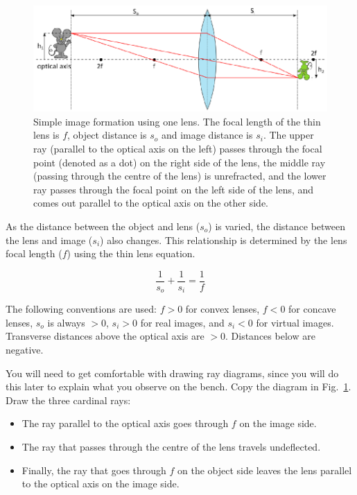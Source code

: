 \documentclass[a4paper]{report}
\begin{document}
\begin{figure}[h]
\center
\includegraphics{image_forming_basics.eps}
\caption{Simple image formation using one lens. 
The focal length of the thin lens is $f$, object distance is $s_o$ and image distance is $s_i$. 
The upper ray (parallel to the optical axis on the left) passes through the focal point (denoted as a dot) on the right side of the lens, the middle ray (passing through the centre of the lens) is unrefracted, and the lower ray passes through the focal point on the left side of the lens, and comes out parallel to the optical axis on the other side. 
}
\label{fig:imageforming}
\end{figure}

As the distance between the object and lens ($s_o$) is varied, the distance between the lens and image ($s_i$) also changes. This relationship is determined by the lens focal length ($f$) using the thin lens equation.

\begin{equation}
\frac{1}{s_o} + \frac{1}{s_i} = \frac{1}{f}
\label{eq:thinlens}
\end{equation}

The following conventions are used: $f>0$ for convex lenses, $f<0$ for concave lenses, $s_o$ is always $>0$, $s_i>0$ for real images, and $s_i<0$ for virtual images.
Transverse distances above the optical axis are $>0$. Distances below are negative. 

\vspace{2.5em}
You will need to get comfortable with drawing ray diagrams, since you will do this later to explain what you observe on the bench.
Copy the diagram in Fig.~\ref{fig:imageforming}.
Draw the three cardinal rays:
\begin{itemize}
\item The ray parallel to the optical axis goes through $f$ on the image side.
\item The ray that passes through the centre of the lens travels undeflected.
\item Finally, the ray that goes through $f$ on the object side leaves the lens parallel to the optical axis on the image side. 
\end{itemize}
\end{document}
